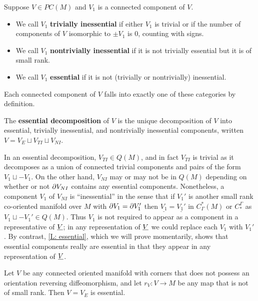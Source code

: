 \begin{definition}\label{D: essential}
Suppose $V\in PC(M)$ and $V_1$ is a connected component of $V$.
\begin{itemize}
\item We call $V_1$  \textbf{trivially inessential} if either
$V_1$ is trivial or if the number of components of 
$V$ isomorphic to $\pm V_1$ is $0$,  counting with signs.

\item We call ${V_1}$ \textbf{nontrivially inessential} if it is not trivially essential but it is of small rank.

\item We call ${V_1}$ \textbf{essential} if it is not  (trivially or nontrivially) inessential.
\end{itemize}

Each connected component of $V$ falls into exactly one of these categories by definition. 

The {\bf essential decomposition} of $V$ is the unique decomposition of $V$ into essential, trivially inessential, and nontrivially inessential components, 
written $V=V_E\sqcup V_{TI}\sqcup V_{NI}$. 
\end{definition}

In an essential decomposition,  $V_{TI}\in Q(M)$, and in fact $V_{TI}$ is trivial as it decomposes as a union of connected trivial components and pairs of the form $V_1\sqcup -V_1$. On the other hand, $V_{NI}$ may or may not be in $Q(M)$ depending on whether or not $\partial V_{NI}$ 
contains any essential components. Nonetheless, a component  $V_1$ of $V_{NI}$ is ``inessential'' in the sense that if $V_1'$ is another small rank co-oriented manifold over $M$ with $\partial V_1=\partial V_1'$ then $\underline{V_1}=\underline{V_1'}$ in $C_\Gamma^*(M)$ or $C_*^\Gamma$ as $V_1\sqcup -V_1'\in Q(M)$. Thus $V_1$ is not required to appear as a component in a representative of $\underline{V}$; in any representation of $\underline{V}$ we could replace each $V_1$ with $V_1'$. By contrast, \cref{L: essential}, which we will prove momentarily, shows that essential components really are essential in that they appear in any representation of $\underline{V}$.  


\begin{example}
Let $V$ be any connected oriented manifold with corners that does not possess an orientation reversing diffeomorphism, and let $r_V:V\to M$ be any map that is not of small rank. Then $V=V_E$ is essential.
\end{example}

